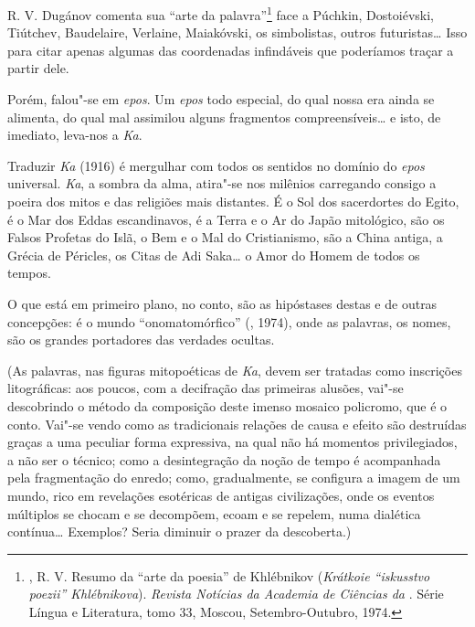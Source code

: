 R. V. Dugánov comenta sua ``arte da palavra''\footnote{,
R. V. Resumo da ``arte da poesia'' de Khlébnikov (\emph{Krátkoie ``iskusstvo
poezii'' Khlébnikova}). \emph{Revista Notícias da Academia de Ciências da
}. Série Língua e Literatura, tomo 33, Moscou, Setembro-Outubro,
1974.} face a Púchkin, Dostoiévski, Tiútchev, Baudelaire, Verlaine,
Maiakóvski, os simbolistas, outros futuristas\ldots{} Isso para citar
apenas algumas das coordenadas infindáveis que poderíamos traçar a partir dele.

Porém, falou"-se em \emph{epos}. Um \emph{epos} todo especial, do qual
nossa era ainda se alimenta, do qual mal assimilou alguns fragmentos
compreensíveis\ldots{} e isto, de imediato, leva-nos a \emph{Ka}.

Traduzir \emph{Ka} (1916) é mergulhar com todos os sentidos no domínio
do \emph{epos} universal. \emph{Ka}, a sombra da alma, atira"-se nos
milênios carregando consigo a poeira dos mitos e das religiões mais
distantes. É o Sol dos sacerdortes do Egito, é o Mar dos Eddas
escandinavos, é a Terra e o Ar do Japão mitológico, são os Falsos
Profetas do Islã, o Bem e o Mal do Cristianismo, são a China antiga, a
Grécia de Péricles, os Citas de Adi Saka\ldots{} o Amor do Homem de todos os
tempos.

O que está em primeiro plano, no conto, são as hipóstases destas e de
outras concepções: é o mundo ``onomatomórfico'' (, 1974), onde as
palavras, os nomes, são os grandes portadores das verdades ocultas.

(As palavras, nas figuras mitopoéticas de \emph{Ka}, devem ser tratadas
como inscrições litográficas: aos poucos, com a decifração das primeiras
alusões, vai"-se descobrindo o método da composição deste imenso mosaico
policromo, que é o conto. Vai"-se vendo como as tradicionais relações de
causa e efeito são destruídas graças a uma peculiar forma expressiva, na
qual não há momentos privilegiados, a não ser o técnico; como a
desintegração da noção de tempo é acompanhada pela fragmentação do
enredo; como, gradualmente, se configura a imagem de um mundo, rico em
revelações esotéricas de antigas civilizações, onde os eventos múltiplos
se chocam e se decompõem, ecoam e se repelem, numa dialética contínua\ldots{}
Exemplos? Seria diminuir o prazer da descoberta.)

